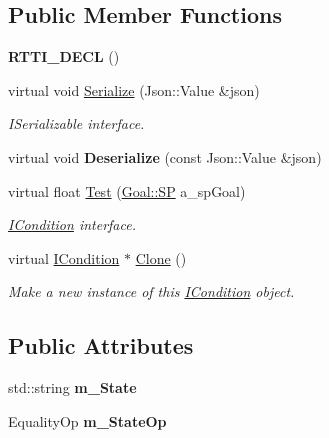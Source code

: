 \subsection*{Public Member Functions}
\begin{DoxyCompactItemize}
\item 
\mbox{\label{struct_goal_state_condition_a592496e5a3f401d189b60f6b93eae399}} 
{\bfseries R\+T\+T\+I\+\_\+\+D\+E\+CL} ()
\item 
\mbox{\label{struct_goal_state_condition_aaedb041a4f83d1feef277646c871ef1a}} 
virtual void \hyperlink{struct_goal_state_condition_aaedb041a4f83d1feef277646c871ef1a}{Serialize} (Json\+::\+Value \&json)
\begin{DoxyCompactList}\small\item\em I\+Serializable interface. \end{DoxyCompactList}\item 
\mbox{\label{struct_goal_state_condition_ad23be1fcc6e3558ac6a229f90f715a1a}} 
virtual void {\bfseries Deserialize} (const Json\+::\+Value \&json)
\item 
\mbox{\label{struct_goal_state_condition_a43167bb48fbca9fd20101fb8ed192b53}} 
virtual float \hyperlink{struct_goal_state_condition_a43167bb48fbca9fd20101fb8ed192b53}{Test} (\hyperlink{class_goal_a818ae12a4d1f28bd433dab2a830a390e}{Goal\+::\+SP} a\+\_\+sp\+Goal)
\begin{DoxyCompactList}\small\item\em \hyperlink{class_i_condition}{I\+Condition} interface. \end{DoxyCompactList}\item 
\mbox{\label{struct_goal_state_condition_af005e2b300909d3776d9dfeb0482bd32}} 
virtual \hyperlink{class_i_condition}{I\+Condition} $\ast$ \hyperlink{struct_goal_state_condition_af005e2b300909d3776d9dfeb0482bd32}{Clone} ()
\begin{DoxyCompactList}\small\item\em Make a new instance of this \hyperlink{class_i_condition}{I\+Condition} object. \end{DoxyCompactList}\end{DoxyCompactItemize}
\subsection*{Public Attributes}
\begin{DoxyCompactItemize}
\item 
\mbox{\label{struct_goal_state_condition_a065615b77bf91542641dc0e14636ff5b}} 
std\+::string {\bfseries m\+\_\+\+State}
\item 
\mbox{\label{struct_goal_state_condition_aad6284a4ab67626a64dd10470fde199c}} 
Equality\+Op {\bfseries m\+\_\+\+State\+Op}
\end{DoxyCompactItemize}

